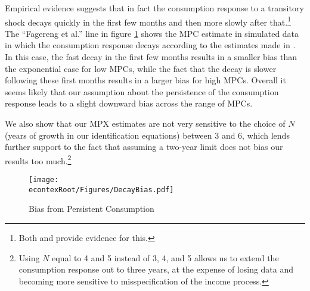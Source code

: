 \documentclass[titlepage]{\econtex}\newcommand{\texname}{ConsumptionHeterogeneity}
\begin{document}
	Empirical evidence suggests that in fact the consumption response to a transitory shock decays quickly in the first few months and then more slowly after that.\footnote{Both \cite{fagereng_mpc_2016} and \cite{gelman_what_2016} provide evidence for this.} The ``Fagereng et al.'' line in figure \ref{fig:DecayBias} shows the MPC estimate in simulated data in which the consumption response decays according to the estimates made in \cite{fagereng_mpc_2016}. In this case, the fast decay in the first few months results in a smaller bias than the exponential case for low MPCs, while the fact that the decay is slower following these first months results in a larger bias for high MPCs. Overall it seems likely that our assumption about the persistence of the consumption response leads to a slight downward bias across the range of MPCs.
	
	We also show that our MPX estimates are not very sensitive to the choice of $N$ (years of growth in our identification equations) between 3 and 6, which lends further support to the fact that assuming a two-year limit does not bias our results too much.\footnote{Using $N$ equal to 4 and 5 instead of 3, 4, and 5 allows us to extend the consumption response out to three years, at the expense of losing data and becoming more sensitive to misspecification of the income process.}
	\begin{figure} 
		\begin{centering}
			\texttt{[image: \\econtexRoot/Figures/DecayBias.pdf]}
			\caption{Bias from Persistent Consumption}
			\label{fig:DecayBias}
		\end{centering}
	\end{figure}
	
\end{document}
